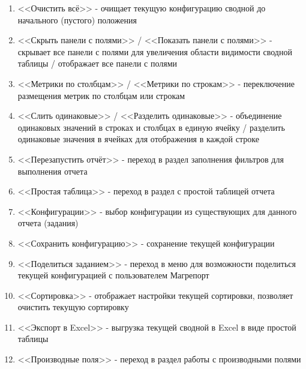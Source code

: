 \documentclass[../user-manual.tex]{subfiles}
\begin{document}
	\begin{enumerate}
		
		\item <<Очистить всё>> - очищает текущую конфигурацию сводной до начального (пустого) положения
		
		\item <<Скрыть панели с полями>> / <<Показать панели с полями>> - скрывает все панели с полями для увеличения области видимости сводной таблицы / отображает все панели с полями
		
		\item <<Метрики по столбцам>> / <<Метрики по строкам>> - переключение размещения метрик по столбцам или строкам
		
		\item <<Слить одинаковые>> / <<Разделить одинаковые>> - объединение одинаковых значений в строках и столбцах в единую ячейку / разделить одинаковые значения в ячейках для отображения в каждой строке
		
		\item <<Перезапустить отчёт>> - переход в раздел заполнения фильтров для выполнения отчета
		
		\item <<Простая таблица>> - переход в раздел с простой таблицей отчета
		
		\item <<Конфигурации>> - выбор конфигурации из существующих для данного отчета (задания)
		
		\item <<Сохранить конфигурацию>> - сохранение текущей конфигурации
		
		\item <<Поделиться заданием>> - переход в меню для возможности поделиться текущей конфигурацией с пользователем Магрепорт
		
		\item <<Сортировка>> - отображает настройки текущей сортировки, позволяет очистить текущую сортировку
		
		\item <<Экспорт в Excel>> - выгрузка текущей сводной в Excel в виде простой таблицы
		
		\item <<Производные поля>> - переход в раздел работы с производными полями
		
	\end{enumerate}
	
\end{document}
